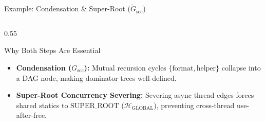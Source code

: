 \documentclass[11pt]{beamer}
\begin{document}
\begin{frame}[fragile]{Example: Condensation \& Super-Root ($\widetilde{G}_{\text{scc}}$)}
\begin{columns}[T,onlytextwidth]
\begin{column}{0.55\textwidth}

      \vspace{-0.4em}
      \begin{block}{Why Both Steps Are Essential}
        \scriptsize
        \begin{itemize}\setlength{\itemsep}{1.5pt}\setlength{\parsep}{0pt}
          \item \textbf{Condensation ($G_{\text{scc}}$):} Mutual recursion cycles $\{\text{format}, \text{helper}\}$ collapse into a DAG node, making dominator trees well-defined.
          \item \textbf{Super-Root Concurrency Severing:} Severing async thread edges forces shared statics to $\text{SUPER\_ROOT}$ ($\mathcal{H}_{\text{GLOBAL}}$), preventing cross-thread use-after-free.
        \end{itemize}
      \end{block}
    \end{column}
  \end{columns}
\end{frame}
\endgroup
\end{document}
